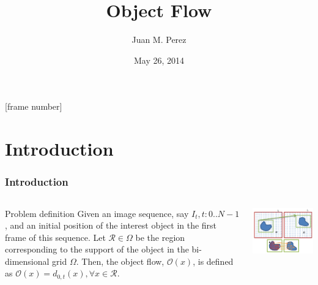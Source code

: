 \documentclass{beamer}
\title{Object Flow}
\author{Juan M. Perez}
\date{May 26, 2014}
\begin{document}
[frame number]
\frame{\titlepage}

\section[Outline]{}
\frame{\tableofcontents}

\section{Introduction}

\begin{frame}
	\frametitle{Introduction}
  \begin{columns}[T]
    \begin{column}{.5\textwidth}
		\begin{block}{Problem definition}
Given an image sequence, say $I_t, t:0..N-1$, and an initial position of the interest object in the first frame of this sequence. Let $\mathcal{R} \in \Omega$ be the region corresponding to the support of the object in the bi-dimensional grid $\Omega$. Then, the object flow, $\mathcal{O}(x)$,  is defined as $\mathcal{O}(x) = d_{0,t}(x), \forall x \in \mathcal{R}$.		
		\end{block}
    \end{column}
    \begin{column}{.5\textwidth}
		\includegraphics[width=1.0\textwidth]{../images/diagram.png}
    \end{column}
  \end{columns}
\end{frame}
\end{document}
